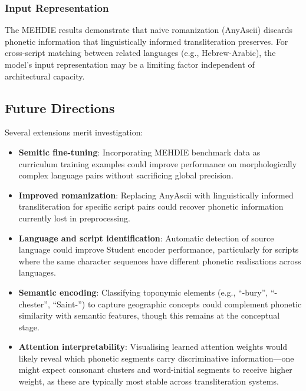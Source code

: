 \documentclass[11pt]{article}
\begin{document}
    \subsubsection{Input Representation}
    The MEHDIE results demonstrate that naive romanization (AnyAscii) discards
    phonetic information that linguistically informed transliteration preserves.
    For cross-script matching between related languages (e.g., Hebrew-Arabic),
    the model's input representation may be a limiting factor independent of
    architectural capacity.

    \subsection{Future Directions}

    Several extensions merit investigation:

    \begin{itemize}
        \item \textbf{Semitic fine-tuning}: Incorporating MEHDIE benchmark data
        as curriculum training examples could improve performance on
        morphologically complex language pairs without sacrificing global precision.

        \item \textbf{Improved romanization}: Replacing AnyAscii with
        linguistically informed transliteration for specific script pairs
        could recover phonetic information currently lost in preprocessing.

        \item \textbf{Language and script identification}: Automatic detection
        of source language could improve Student encoder performance, particularly
        for scripts where the same character sequences have different phonetic
        realisations across languages.

        \item \textbf{Semantic encoding}: Classifying toponymic elements
        (e.g., ``-bury'', ``-chester'', ``Saint-'') to capture geographic
        concepts could complement phonetic similarity with semantic features,
        though this remains at the conceptual stage.

        \item \textbf{Attention interpretability}: Visualising learned attention
        weights would likely reveal which phonetic segments carry discriminative
        information---one might expect consonant clusters and word-initial
        segments to receive higher weight, as these are typically most stable
        across transliteration systems.
    \end{itemize}
\end{document}
